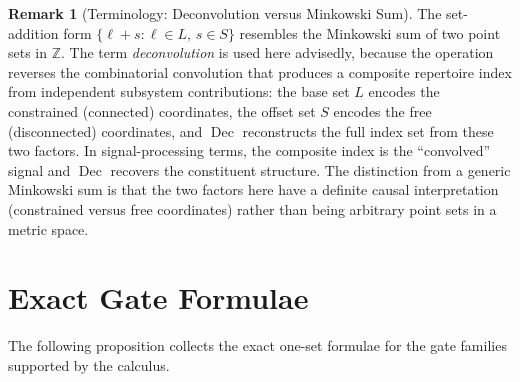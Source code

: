 \documentclass[11pt]{article}
\theoremstyle{definition}
\newtheorem{remark}{Remark}
\begin{document}
\begin{remark}[Terminology: Deconvolution versus Minkowski Sum]
The set-addition form \(\{\ell+s:\ell\in L,\,s\in S\}\) resembles the Minkowski sum of two
point sets in \(\mathbb{Z}\). The term \emph{deconvolution} is used here advisedly, because the
operation reverses the combinatorial convolution that produces a composite repertoire index from
independent subsystem contributions: the base set \(L\) encodes the constrained (connected)
coordinates, the offset set \(S\) encodes the free (disconnected) coordinates, and
\(\operatorname{Dec}\) reconstructs the full index set from these two factors. In signal-processing
terms, the composite index is the ``convolved'' signal and \(\operatorname{Dec}\) recovers the
constituent structure. The distinction from a generic Minkowski sum is that the two factors here
have a definite causal interpretation (constrained versus free coordinates) rather than being
arbitrary point sets in a metric space.
\end{remark}

\section{Exact Gate Formulae}
The following proposition collects the exact one-set formulae for the gate families supported by the calculus.
\end{document}

